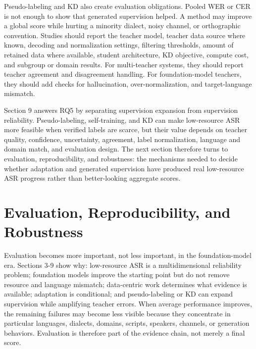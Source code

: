 \documentclass[pdflatex,sn-basic,iicol]{sn-jnl}
\theoremstyle{thmstyleone}
\theoremstyle{thmstyletwo}
\theoremstyle{thmstylethree}
\begin{document}
Pseudo-labeling and KD also create evaluation obligations. Pooled WER or CER is not enough to show that generated supervision helped. A method may improve a global score while hurting a minority dialect, noisy channel, or orthographic convention. Studies should report the teacher model, teacher data source where known, decoding and normalization settings, filtering thresholds, amount of retained data where available, student architecture, KD objective, compute cost, and subgroup or domain results. For multi-teacher systems, they should report teacher agreement and disagreement handling. For foundation-model teachers, they should add checks for hallucination, over-normalization, and target-language mismatch.

Section 9 answers RQ5 by separating supervision expansion from supervision reliability. Pseudo-labeling, self-training, and KD can make low-resource ASR more feasible when verified labels are scarce, but their value depends on teacher quality, confidence, uncertainty, agreement, label normalization, language and domain match, and evaluation design. The next section therefore turns to evaluation, reproducibility, and robustness: the mechanisms needed to decide whether adaptation and generated supervision have produced real low-resource ASR progress rather than better-looking aggregate scores.

\section{Evaluation, Reproducibility, and Robustness}

Evaluation becomes more important, not less important, in the foundation-model era. Sections 3-9 show why: low-resource ASR is a multidimensional reliability problem; foundation models improve the starting point but do not remove resource and language mismatch; data-centric work determines what evidence is available; adaptation is conditional; and pseudo-labeling or KD can expand supervision while amplifying teacher errors. When average performance improves, the remaining failures may become less visible because they concentrate in particular languages, dialects, domains, scripts, speakers, channels, or generation behaviors. Evaluation is therefore part of the evidence chain, not merely a final score.
\end{document}
